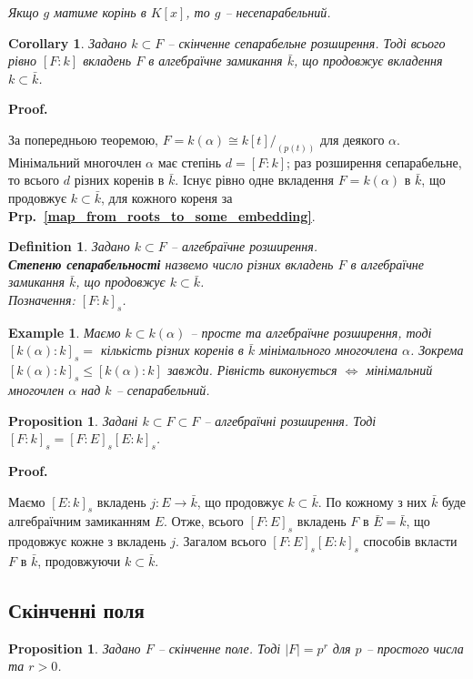 \documentclass[a4paper, 10pt]{article}
\makeatletter
\theoremstyle{theoremdd}
\theoremstyle{theoremdd}
\newtheorem{definition}[theorem]{Definition}
\theoremstyle{theoremdd}
\theoremstyle{theoremdd}
\theoremstyle{theoremdd}
\newtheorem{example}[theorem]{Example}
\theoremstyle{theoremdd}
\theoremstyle{theoremdd}
\theoremstyle{theoremdd}
\theoremstyle{theoremdd}
\newtheorem{proposition}[theorem]{Proposition}
\theoremstyle{theoremdd}
\theoremstyle{theoremdd}
\theoremstyle{theoremdd}
\theoremstyle{theoremdd}
\theoremstyle{theoremdd}
\newtheorem{corollary}[theorem]{Corollary}
\theoremstyle{theoremdd}
\renewenvironment{proof}[1][Proof.\\]{\par
\pushQED{\hfill \qed}%
\normalfont \topsep6\p@\@plus6\p@\relax
\trivlist
\item\relax
{\bfseries
#1\@addpunct{.}}\hspace\labelsep\ignorespaces
}{%
\popQED\endtrivlist\@endpefalse
}
\newcommand\prpref[1]{\textbf{Prp.~\ref{#1}}}
\makeatother
\begin{document}
\textit{Якщо $g$ матиме корінь в $K[x]$, то $g$ -- несепарабельний.}

\begin{corollary}
Задано $k \subset F$ -- скінченне сепарабельне розширення. Тоді всього рівно $[F:k]$ вкладень $F$ в алгебраїчне замикання $\bar{k}$, що продовжує вкладення $k \subset \bar{k}$.
\end{corollary}

\begin{proof}
За попередньою теоремою, $F = k(\alpha) \cong k[t]/_{(p(t))}$ для деякого $\alpha$. Мінімальний многочлен $\alpha$ має степінь $d = [F:k]$; раз розширення сепарабельне, то всього $d$ різних коренів в $\bar{k}$. Існує рівно одне вкладення $F = k(\alpha)$ в $\bar{k}$, що продовжує $k \subset \bar{k}$, для кожного кореня за \prpref{map_from_roots_to_some_embedding}.
\end{proof}

\begin{definition}
Задано $k \subset F$ -- алгебраїчне розширення.\\
\textbf{Степеню сепарабельності} назвемо число різних вкладень $F$ в алгебраїчне замикання $\bar{k}$, що продовжує $k \subset \bar{k}$.\\
Позначення: $[F:k]_s$.
\end{definition}

\begin{example}
Маємо $k \subset k(\alpha)$ -- просте та алгебраїчне розширення, тоді $[k(\alpha):k]_s = $ кількість різних коренів в $\bar{k}$ мінімального многочлена $\alpha$. Зокрема $[k(\alpha):k]_s \leq [k(\alpha):k]$ завжди. Рівність виконується $\iff$ мінімальний многочлен $\alpha$ над $k$ -- сепарабельний.
\end{example}

\begin{proposition}
Задані $k \subset F \subset F$ -- алгебраїчні розширення. Тоді $[F:k]_s = [F:E]_s [E:k]_s$.
\end{proposition}

\begin{proof}
Маємо $[E:k]_s$ вкладень $j \colon E \to \bar{k}$, що продовжує $k \subset \bar{k}$. По кожному з них $\bar{k}$ буде алгебраїчним замиканням $E$. Отже, всього $[F:E]_s$ вкладень $F$ в $\bar{E} = \bar{k}$, що продовжує кожне з вкладень $j$. Загалом всього $[F:E]_s [E:k]_s$ способів вкласти $F$ в $\bar{k}$, продовжуючи $k \subset \bar{k}$.
\end{proof}

\subsection{Скінченні поля}
\begin{proposition}
Задано $F$ -- скінченне поле. Тоді $|F| = p^r$ для $p$ -- простого числа та $r > 0$.
\end{proposition}
\end{document}
